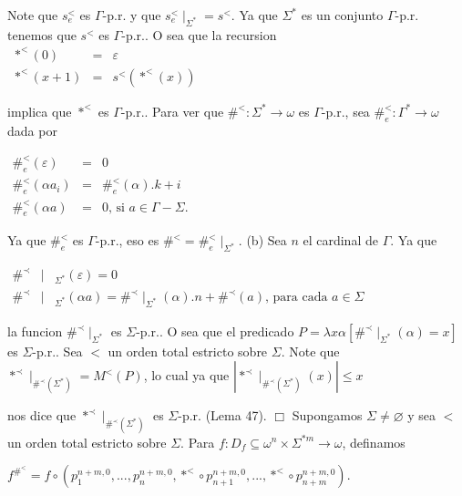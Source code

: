 Note que \(s_{e}^{< }\) es \(\Gamma \)-p.r. y que \(s_{e}^{< }\mid _{\Sigma ^{\ast }}=s^{< }\). Ya que \(\Sigma ^{\ast }\) es un conjunto \(\Gamma \)-p.r. tenemos que \(s^{< }\) es \(\Gamma \)-p.r.. O sea que la recursion
\(\displaystyle \begin{array}{rcl} \ast ^{< }(0) & =& \varepsilon \\ \ast ^{< }(x+1) & =& s^{< }(\ast ^{< }(x)) \end{array} \)

implica que \(\ast ^{< }\) es \(\Gamma \)-p.r..
Para ver que \(\#^{< }:\Sigma ^{\ast }\rightarrow \omega \) es \(\Gamma \)-p.r., sea \(\#_{e}^{< }:\Gamma ^{\ast }\rightarrow \omega \) dada por

\(\displaystyle \begin{array}{rcl} \#_{e}^{< }(\varepsilon ) & =& 0 \\ \#_{e}^{< }(\alpha a_{i}) & =& \#_{e}^{< }(\alpha ).k+i \\ \#_{e}^{< }(\alpha a) & =& 0\text{, si }a\in \Gamma -\Sigma . \end{array} \)

Ya que \(\#_{e}^{< }\) es \(\Gamma \)-p.r., eso es \(\#^{< }=\#_{e}^{< }\mid _{\Sigma ^{\ast }}\).
(b) Sea \(n\) el cardinal de \(\Gamma .\) Ya que

\(\displaystyle \begin{array}{rcl} \#^{\prec } & \mid & _{\Sigma ^{\ast }}(\varepsilon )=0 \\ \#^{\prec } & \mid & _{\Sigma ^{\ast }}(\alpha a)=\#^{\prec }\mid _{\Sigma ^{\ast }}(\alpha ).n+\#^{\prec }(a)\text{, para cada }a\in \Sigma \end{array} \)

la funcion \(\#^{\prec }\mid _{\Sigma ^{\ast }}\) es \(\Sigma \)-p.r.. O sea que el predicado \(P=\lambda x\alpha \left[ \#^{\prec }\mid _{\Sigma ^{\ast }}(\alpha )=x\right] \) es \(\Sigma \)-p.r.. Sea \(< \) un orden total estricto sobre \(\Sigma \). Note que \(\ast ^{\prec }\mid _{\#^{\prec }(\Sigma ^{\ast })}=M^{< }(P)\), lo cual ya que
\(\displaystyle \left\vert \ast ^{\prec }\mid _{\#^{\prec }(\Sigma ^{\ast })}(x)\right\vert \leq x \)

nos dice que \(\ast ^{\prec }\mid _{\#^{\prec }(\Sigma ^{\ast })}\) es \(\Sigma \)-p.r. (Lema 47). \(\Box\)
Supongamos \(\Sigma \neq \varnothing \) y sea \(< \) un orden total estricto sobre \( \Sigma \). Para \(f:D_{f}\subseteq \omega ^{n}\times \Sigma ^{\ast m}\rightarrow \omega \), definamos

\(\displaystyle f^{\#^{< }}=f\circ \left( p_{1}^{n+m,0},...,p_{n}^{n+m,0},\ast ^{< }\circ p_{n+1}^{n+m,0},...,\ast ^{< }\circ p_{n+m}^{n+m,0}\right) . \)

